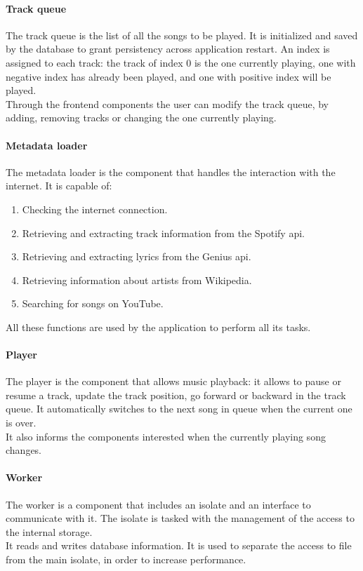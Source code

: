 \documentclass{article}
\begin{document}
\paragraph{Track queue}
The track queue is the list of all the songs to be played. It is initialized and
saved by the database to grant persistency across application restart. An index
is assigned to each track: the track of index 0 is the one currently playing,
one with negative index has already been played, and one with positive index
will be played.
\\
Through the frontend components the user can modify the track queue, by adding,
removing tracks or changing the one currently playing.

\paragraph{Metadata loader}
The metadata loader is the component that handles the interaction with the
internet. It is capable of:
\begin{enumerate}
    \item Checking the internet connection.
    \item Retrieving and extracting track information from the Spotify api.
    \item Retrieving and extracting lyrics from the Genius api.
    \item Retrieving information about artists from Wikipedia.
    \item Searching for songs on YouTube.
\end{enumerate}
All these functions are used by the application to perform all its tasks.

\paragraph{Player}
The player is the component that allows music playback: it allows to pause or
resume a track, update the track position, go forward or backward in the track
queue. It automatically switches to the next song in queue when the current one
is over.
\\
It also informs the components interested when the currently playing song
changes.


\paragraph{Worker}
The worker is a component that includes an isolate and an interface to
communicate with it. The isolate is tasked with the management of the access to
the internal storage.
\\
It reads and writes database information. It is used to separate the access to
file from the main isolate, in order to increase performance.
\end{document}

